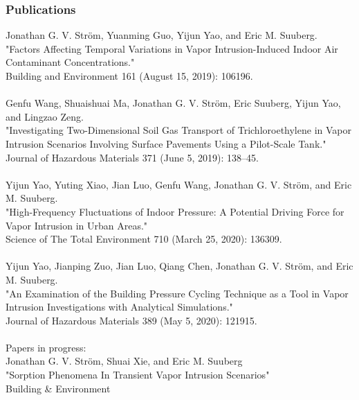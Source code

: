 \subsubsection*{\textbf{Publications}}
Jonathan G. V. Ström, Yuanming Guo, Yijun Yao, and Eric M. Suuberg.\\
"Factors Affecting Temporal Variations in Vapor Intrusion-Induced Indoor Air Contaminant Concentrations."\\
Building and Environment 161 (August 15, 2019): 106196.\\
\\
Genfu Wang, Shuaishuai Ma, Jonathan G. V. Ström, Eric Suuberg, Yijun Yao, and Lingzao Zeng.\\
"Investigating Two-Dimensional Soil Gas Transport of Trichloroethylene in Vapor Intrusion Scenarios Involving Surface Pavements Using a Pilot-Scale Tank."\\
Journal of Hazardous Materials 371 (June 5, 2019): 138–45.\\
\\
Yijun Yao, Yuting Xiao, Jian Luo, Genfu Wang, Jonathan G. V. Ström, and Eric M. Suuberg.\\
"High-Frequency Fluctuations of Indoor Pressure: A Potential Driving Force for Vapor Intrusion in Urban Areas."\\
Science of The Total Environment 710 (March 25, 2020): 136309.\\
\\
Yijun Yao, Jianping Zuo, Jian Luo, Qiang Chen, Jonathan G. V. Ström, and Eric M. Suuberg.\\
"An Examination of the Building Pressure Cycling Technique as a Tool in Vapor Intrusion Investigations with Analytical Simulations."\\
Journal of Hazardous Materials 389 (May 5, 2020): 121915.\\
\\
Papers in progress: \\
Jonathan G. V. Ström, Shuai Xie, and Eric M. Suuberg\\
"Sorption Phenomena In Transient Vapor Intrusion Scenarios"\\
Building \& Environment\\

\vfill
\newpage
